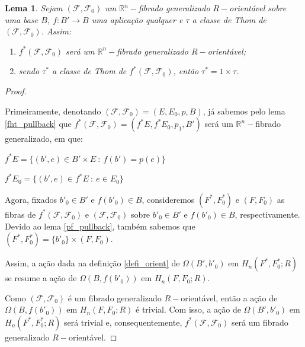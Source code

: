 \documentclass[12pt,oneside]{book} %
\newtheorem{lem}    {\hspace{0.5cm}Lema}[chapter]
\newcommand{\R}{\mathbb{R}}
\begin{document}
\begin{lem}\label{lema_thom_2}
	Sejam $(\mathcal{F},\mathcal{F}_{0})$ um $\R^{n}-$fibrado generalizado $R-$orientável sobre uma base $B$, $f:B'\to B$ uma aplicação qualquer e $\tau$ a classe de Thom de $(\mathcal{F},\mathcal{F}_{0})$. Assim:
	\begin{enumerate}
		\item $f^{*}(\mathcal{F},\mathcal{F}_{0})$ será um $\R^{n}-$fibrado generalizado $R-$orientável;
		\item sendo $\tau^{*}$ a classe de Thom de $f^{*}(\mathcal{F},\mathcal{F}_{0})$, então $\tau^{*}=1\times \tau$.
	\end{enumerate}
\end{lem}
\begin{proof}
	
	\
	
	\par Primeiramente, denotando $(\mathcal{F},\mathcal{F}_{0})=(E,E_{0},p,B)$, já sabemos pelo lema \ref{fht_pullback} que $f^{*}(\mathcal{F},\mathcal{F}_{0})=(f^{*}E,f^{*}E_{0},p_{1},B')$ será um $\R^{n}-$fibrado generalizado, em que: \newline
	
	$f^{*}E=\{ (b',e)\in B'\times E \ : \ f(b')=p(e) \}$
	
	$f^{*}E_{0}=\{ (b',e)\in f^{*}E \ : \ e\in E_{0} \}$ \newline
	
	\par Agora, fixados $b'_{0}\in B'$ e $f(b'_{0})\in B$, consideremos $(F^{*},F^{*}_{0})$ e $(F,F_{0})$ as fibras de $f^{*}(\mathcal{F},\mathcal{F}_{0})$ e $(\mathcal{F},\mathcal{F}_{0})$ sobre $b'_{0}\in B'$ e $f(b'_{0})\in B$, respectivamente. Devido ao lema \ref{pf_pullback}, também sabemos que $(F^{*},F^{*}_{0})=\{ b'_{0} \}\times (F,F_{0})$.
	
	\par Assim, a ação dada na definição \ref{defi_orient} de $\Omega(B',b'_{0})$ em $H_{n}(F^{*},F^{*}_{0};R)$ se resume a ação de $\Omega(B,f(b'_{0}))$ em $H_{n}(F,F_{0};R)$.
	
	\par Como $(\mathcal{F},\mathcal{F}_{0})$ é um fibrado generalizado $R-$orientável, então a ação de $\Omega(B,f(b'_{0}))$ em $H_{n}(F,F_{0};R)$ é trivial. Com isso, a ação de $\Omega(B',b'_{0})$ em $H_{n}(F^{*},F^{*}_{0};R)$ será trivial e, consequentemente, $f^{*}(\mathcal{F},\mathcal{F}_{0})$ será um fibrado generalizado $R-$orientável.
	

\end{proof}
\end{document}
